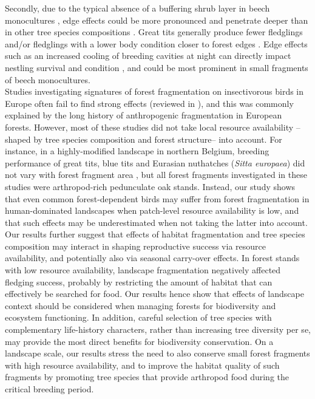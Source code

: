 \documentclass[10pt, twoside]{book} %
\begin{document}
	Secondly, due to the typical absence of a buffering shrub layer in beech monocultures \citep{Dolle2017, Sercu2017}, edge effects could be more pronounced and penetrate deeper than in other tree species compositions \citep{Latimer2017}. Great tits generally produce fewer fledglings and/or fledglings with a lower body condition closer to forest edges \citep{Deng2005, Wilkin2007}. Edge effects such as an increased cooling of breeding cavities at night \citep{Wiebe2001} can directly impact nestling survival and condition \citep{Bleu2017}, and could be most prominent in small fragments of beech monocultures.\\
	
	Studies investigating signatures of forest fragmentation on insectivorous birds in Europe often fail to find strong effects (reviewed in \citealt{Lampila2005}), and this was commonly explained by the long history of anthropogenic fragmentation in European forests. However, most of these studies did not take local resource availability --shaped by tree species composition and forest structure-- into account. For instance, in a highly-modified landscape in northern Belgium, breeding performance of great tits, blue tits and Eurasian nuthatches (\textit{Sitta europaea}) did not vary with forest fragment area \citep{Matthysen1998, Nour1998}, but all forest fragments investigated in these studies were arthropod-rich pedunculate oak stands. Instead, our study shows that even common forest-dependent birds may suffer from forest fragmentation in human-dominated landscapes when patch-level resource availability is low, and that such effects may be underestimated when not taking the latter into account.\\
	
	Our results further suggest that effects of habitat fragmentation and tree species composition may interact in shaping reproductive success via resource availability, and potentially also via seasonal carry-over effects. In forest stands with low resource availability, landscape fragmentation negatively affected fledging success, probably by restricting the amount of habitat that can effectively be searched for food. Our results hence show that effects of landscape context should be considered when managing forests for biodiversity and ecosystem functioning. In addition, careful selection of tree species with complementary life-history characters, rather than increasing tree diversity per se, may provide the most direct benefits for biodiversity conservation. On a landscape scale, our results stress the need to also conserve small forest fragments with high resource availability, and to improve the habitat quality of such fragments by promoting tree species that provide arthropod food during the critical breeding period. \\
	
\end{document}
